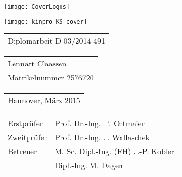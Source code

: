 \begin{titlepage}
\begin{spacing}{2}

\begin{flushright} %
	\vspace*{-20mm}
	\texttt{[image: CoverLogos]}
\end{flushright} %

\vspace{38mm} {

\vfill
\vspace{3mm}
\texttt{[image: kinpro\_KS\_cover]}

\vfill }
\end{spacing}
\begin{spacing}{1}
\begin{tabular}{l}
 \Large{Diplomarbeit D-03/2014-491}
\end{tabular}

\vspace{5mm}

\begin{tabular}{l}
\large{Lennart Claassen}\\
\large{Matrikelnummer 2576720}
\end{tabular}

\vspace{5mm}

\begin{tabular}{l}
\large{Hannover, März 2015}
\end{tabular}


\vspace{5mm}
{\large
\begin{tabular}{l l}
Erstprüfer  & Prof. Dr.-Ing. T. Ortmaier\\
Zweitprüfer & Prof. Dr.-Ing. J. Wallaschek\\
Betreuer    & M. Sc. Dipl.-Ing. (FH) J.-P. Kobler\\
& Dipl.-Ing. M. Dagen\\
\end{tabular}
}

\end{spacing}
\end{titlepage}



